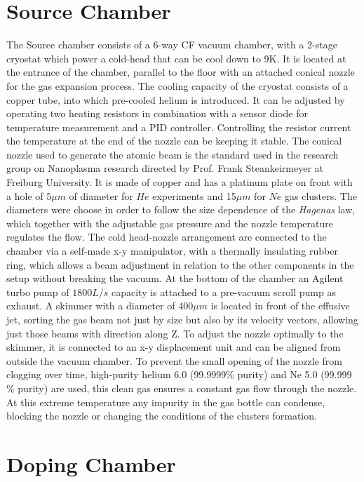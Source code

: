 \section{Source Chamber}

The Source chamber consists of a 6-way CF vacuum chamber, with a 2-stage cryostat which power a cold-head that can be cool down to 9K. It is located at the entrance of the chamber, parallel to the floor with an attached conical nozzle for the gas expansion process. The cooling capacity of the cryostat consists of a copper tube, into which pre-cooled helium is introduced. It can be adjusted by operating two heating resistors in combination with a sensor diode for temperature measurement and a PID controller. Controlling the resistor current the temperature at the end of the nozzle can be keeping it stable. The conical nozzle used to generate the atomic beam is the standard used in the research group on Nanoplasma research directed by Prof. Frank Steankeirmeyer at Freiburg University.  It is made of copper and has a platinum plate on front with a hole of 5$\mu m$ of diameter for $He$ experiments and 15$\mu m$ for $Ne$ gas clusters. The diameters were choose in order to follow the size dependence of the \textit{Hagenas} law, which together with the adjustable gas pressure and the nozzle temperature regulates the flow.
The cold head-nozzle arrangement are connected to the chamber via a self-made x-y manipulator,  with a thermally insulating rubber ring, which allows a beam adjustment in relation to the other components in the setup without breaking the vacuum. At the bottom of the chamber an Agilent turbo pump of $1800 L/s$ capacity is attached to a pre-vacuum scroll pump as exhaust.
A skimmer with a diameter of $400\mu m$ is located in front of the effusive jet, sorting the gas beam not just by size but also by its velocity vectors, allowing just those beams with direction along Z. To adjust the nozzle optimally to the skimmer, it is connected to an x-y displacement unit and can be aligned from outside the vacuum chamber. To prevent the small opening of the nozzle from clogging over time, high-purity helium 6.0 (99.9999$\%$ purity) and Ne 5.0 (99.999$\%$ purity) are used, this clean gas ensures a constant gas flow through the nozzle. At this extreme temperature any impurity in the gas bottle can condense, blocking the nozzle or changing the conditions of the clusters formation. 

\section{Doping Chamber}

